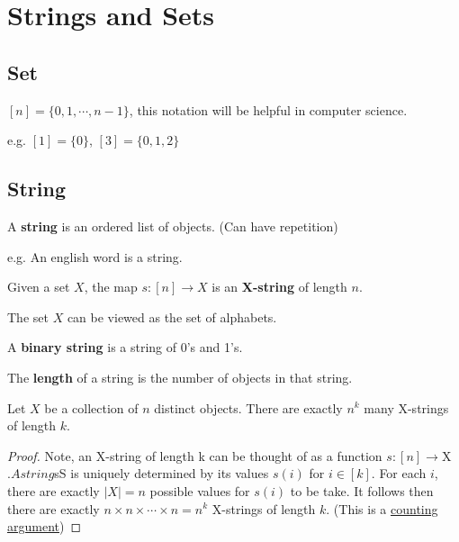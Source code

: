 \chapter{Strings and Sets}

\section{Set}

\begin{definition}
    $[n]=\{0,1, \cdots ,n-1\}$, this notation will be helpful in computer science.
\end{definition}
e.g. $[1]=\{0\}$, $[3]=\{0,1,2\}$

\section{String}

\begin{definition}
    A \textbf{string} is an ordered list of objects. (Can have repetition)
\end{definition}
e.g. An english word is a string.

\begin{definition}
    Given a set $X$, 
    the map $s:[n] \rightarrow X$ is an \textbf{X-string} of length $n$. 
\end{definition}
The set $X$ can be viewed as the set of alphabets.

\begin{definition}
    A \textbf{binary string} is a string of 0's and 1's.
\end{definition}

\begin{definition}
    The \textbf{length} of a string is the number of objects in that string.
\end{definition}

\begin{theorem}
    Let $X$ be a collection of $n$ distinct objects. There are exactly $n^k$ many X-strings of length $k$.
\end{theorem}

\begin{proof}
    Note, an X-string of length k can be thought of as a function $s:[n] \rightarrow $X$. 
    A string $sS is uniquely determined by its values $s(i)$ for $i \in [k]$. 
    For each $i$, there are exactly $|X|=n$ possible values for $s(i)$ to be take. 
    It follows then there are exactly $n \times n \times \cdots \times n = n^k$ X-strings of length $k$. 
    (This is a \underline{counting argument})
\end{proof}

